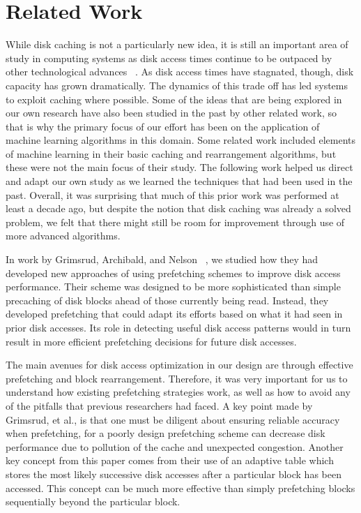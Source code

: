 \documentclass[letterpaper,twocolumn,10pt]{article}
\begin{document}
\section{Related Work}
While disk caching is not a particularly new idea, it is still an important area of study in computing systems as disk access times continue to be outpaced by other technological advances ~\cite{MultiplePrefetch}.  As disk access times have stagnated, though, disk capacity has grown dramatically.  The dynamics of this trade off has led systems to exploit caching where possible.  Some of the ideas that are being explored in our own research have also been studied in the past by other related work, so that is why the primary focus of our effort has been on the application of machine learning algorithms in this domain.  Some related work included elements of machine learning in their basic caching and rearrangement algorithms, but these were not the main focus of their study.  The following work helped us direct and adapt our own study as we learned the techniques that had been used in the past.  Overall, it was surprising that much of this prior work was performed at least a decade ago, but despite the notion that disk caching was already a solved problem, we felt that there might still be room for improvement through use of more advanced algorithms.

In work by Grimsrud, Archibald, and Nelson ~\cite{MultiplePrefetch}, we studied how they had developed new approaches of using prefetching schemes to improve disk access performance.  Their scheme was designed to be more sophisticated than simple precaching of disk blocks ahead of those currently being read.  Instead, they developed prefetching that could adapt its efforts based on what it had seen in prior disk accesses.  Its role in detecting useful disk access patterns would in turn result in more efficient prefetching decisions for future disk accesses.

The main avenues for disk access optimization in our design are through effective prefetching and block rearrangement.  Therefore, it was very important for us to understand how existing prefetching strategies work, as well as how to avoid any of the pitfalls that previous researchers had faced.  A key point made by Grimsrud, et al., is that one must be diligent about ensuring reliable accuracy when prefetching, for a poorly design prefetching scheme can decrease disk performance due to pollution of the cache and unexpected congestion.  Another key concept from this paper comes from their use of an adaptive table which stores the most likely successive disk accesses after a particular block has been accessed.  This concept can be much more effective than simply prefetching blocks sequentially beyond the particular block.
\end{document}
